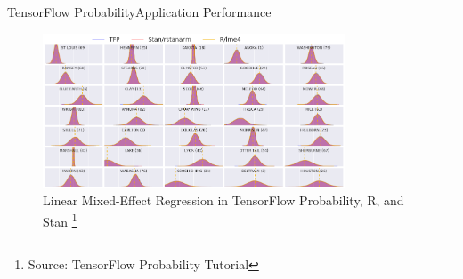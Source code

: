 \documentclass[AERbeamer%
              ,optEnglish%
              ,optBiber%
              ,optBibstyleAlphabetic%
              ,optBeamerClassicFormat%
              ]{AERlatex}%
\begin{document}
\begin{frame}[c]{TensorFlow Probability}{Application Performance}
    \centering
    \begin{figure}
        \centering
        \includegraphics[width=0.8\textwidth]{TFProbAppPerformanceComparison.png}
        \caption{Linear Mixed-Effect Regression in TensorFlow Probability, R, and Stan \footnote{Source: TensorFlow Probability Tutorial}}
    \end{figure}
\end{frame}
\end{document}
